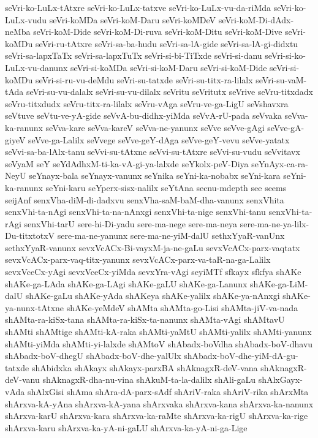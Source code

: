 {seVri-ko-LuLx-tAtxre
seVri-ko-LuLx-tatxve
seVri-ko-LuLx-vu-da-riMda
seVri-ko-LuLx-vudu
seVri-koMDa
seVri-koM-Daru
seVri-koMDeV
seVri-koM-Di-dAdx-neMba
seVri-koM-Dide
seVri-koM-Di-ruva
seVri-koM-Ditu
seVri-koM-Dive
seVri-koMDu
seVri-ru-tAtxre
seVri-sa-ba-hudu
seVri-sa-lA-gide
seVri-sa-lA-gi-didxtu
seVri-sa-lapxTaTx
seVri-sa-lapxTuTx
seVri-si-bi-TiTxde
seVri-si-danu
seVri-si-ko-LuLx-vu-danunx
seVri-si-koMDa
seVri-si-koM-Daru
seVri-si-koM-Dide
seVri-si-koMDu
seVri-si-ru-vu-deMdu
seVri-su-tatxde
seVri-su-titx-ra-lilalx
seVri-su-vaM-tAda
seVri-su-vu-dalalx
seVri-su-vu-dilalx
seVritu
seVritutx
seVrive
seVru-titxdadx
seVru-titxdudx
seVru-titx-ra-lilalx
seVru-vAga
seVru-ve-ga-LigU
seVshavxra
seVtuve
seVtu-ve-yA-gide
seVvA-bu-didhx-yiMda
seVvA-rU-pada
seVvaka
seVva-ka-ranunx
seVva-kare
seVva-kareV
seVva-ne-yanunx
seVve
seVve-gAgi
seVve-gA-giyeV
seVve-ga-Lalilx
seVvege
seVve-geY-dAga
seVve-geY-vevu
seVve-yatatx
seVvi-sa-ba-lAlx-tanu
seVvi-su-tAtxne
seVvi-su-tAtxre
seVvi-su-vudu
seVvitavx
seVyaM
seY
seYdAdhxM-ti-ka-vA-gi-ya-lalxde
seYkolx-peV-Diya
seYnAyx-ca-ra-NeyU
seYnayx-bala
seYnayx-vanunx
seYnika
seYni-ka-nobabx
seYni-kara
seYni-ka-ranunx
seYni-karu
seYperx-sisx-nalilx
seYtAna
secnu-mdepth
see
seems
seijAnf
senxVha-diM-di-dadxvu
senxVha-saM-baM-dha-vanunx
senxVhita
senxVhi-ta-nAgi
senxVhi-ta-na-nAnxgi
senxVhi-ta-nige
senxVhi-tanu
senxVhi-ta-rAgi
senxVhi-tarU
sere-hi-Di-yadu
sere-ma-nege
sere-ma-neya
sere-ma-ne-ya-lilx-Du-titxtotxV
sere-ma-ne-yanunx
sere-ma-ne-yiM-dalU
sethxYyaR-vanUnx
sethxYyaR-vanunx
sevxVcACx-Bi-vayxM-ja-ne-gaLu
sevxVcACx-parx-vaqtatx
sevxVcACx-parx-vaq-titx-yanunx
sevxVcACx-parx-va-taR-na-ga-Lalilx
sevxVceCx-yAgi
sevxVceCx-yiMda
sevxYra-vAgi
seyiMTf
sfkayx
sfkfya
shAKe
shAKe-ga-LAda
shAKe-ga-LAgi
shAKe-gaLU
shAKe-ga-Lanunx
shAKe-ga-LiM-dalU
shAKe-gaLu
shAKe-yAda
shAKeya
shAKe-yalilx
shAKe-ya-nAnxgi
shAKe-ya-nunx-tAtxne
shAKe-yeMdeV
shAMta
shAMta-go-Lisi
shAMta-jiV-va-nada
shAMta-ra-kiSx-tana
shAMta-ra-kiSx-ta-nanunx
shAMta-vAgi
shAMtavU
shAMti
shAMtige
shAMti-kA-raka
shAMti-yaMtU
shAMti-yalilx
shAMti-yanunx
shAMti-yiMda
shAMti-yi-lalxde
shAMtoV
shAbadx-boVdha
shAbadx-boV-dhavu
shAbadx-boV-dhegU
shAbadx-boV-dhe-yalUlx
shAbadx-boV-dhe-yiM-dA-gu-tatxde
shAbidxka
shAkayx
shAkayx-parxBA
shAknagxR-deV-vana
shAknagxR-deV-vanu
shAknagxR-dha-nu-vina
shAkuM-ta-la-dalilx
shAli-gaLu
shAlxGayx-vAda
shAlxGisi
shAma
shAra-dA-parx-sAdf
shAriV-raka
shAriV-rika
shArxMta
shArxva-kA-yAna
shArxva-kA-yana
shArxvaka
shArxva-kana
shArxva-ka-nanunx
shArxva-karU
shArxva-kara
shArxva-ka-raMte
shArxva-ka-rigU
shArxva-ka-rige
shArxva-karu
shArxva-ka-yA-ni-gaLU
shArxva-ka-yA-ni-ga-Lige
}
